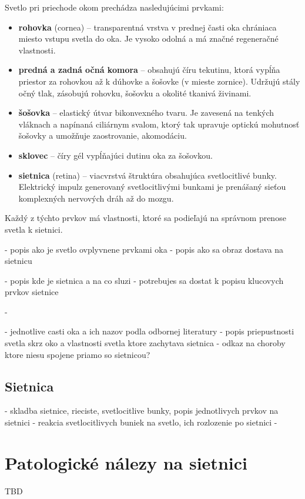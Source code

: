 Svetlo pri priechode okom prechádza nasledujúcimi prvkami\cite{zloz_oka}:
\begin{itemize}
\item \textbf{rohovka} (cornea) -- transparentná vrstva v prednej časti oka chrániaca miesto vstupu svetla do oka. Je vysoko odolná a má značné regeneračné vlastnosti.
\item \textbf{predná a zadná očná komora} -- obsahujú číru tekutinu, ktorá vypĺňa priestor za rohovkou až k dúhovke a šošovke (v mieste zornice). Udržujú stály očný tlak, zásobujú rohovku, šošovku a okolité tkanivá živinami\cite{zmysly}.
\item \textbf{šošovka} -- elastický útvar bikonvexného tvaru. Je zavesená na tenkých vláknach a napínaná ciliárnym svalom, ktorý tak upravuje optickú mohutnosť šošovky a umožňuje zaostrovanie, akomodáciu.
\item \textbf{sklovec} -- číry gél vypĺňajúci dutinu oka za šošovkou.
\item \textbf{sietnica} (retina) -- viacvrstvá štruktúra obsahujúca svetlocitlivé bunky. Elektrický impulz generovaný svetlocitlivými bunkami je prenášaný sieťou komplexných nervových dráh až do mozgu.
\end{itemize}

Každý z týchto prvkov má vlastnosti, ktoré sa podieľajú na správnom prenose svetla k sietnici. 


- popis ako je svetlo ovplyvnene prvkami oka
- popis ako sa obraz dostava na sietnicu

- popis kde je sietnica a na co sluzi \cite{vlast_oka}
- potrebujes sa dostat k popisu klucovych prvkov sietnice

- 

- jednotlive casti oka a ich nazov podla odbornej literatury
- popis priepustnosti svetla skrz oko a vlastnosti svetla ktore zachytava sietnica
- odkaz na choroby ktore niesu spojene priamo so sietnicou?

\section{Sietnica}\label{sec:sietnica}
- skladba sietnice, rieciste, svetlocitlive bunky, popis jednotlivych prvkov na sietnici
- reakcia svetlocitlivych buniek na svetlo, ich rozlozenie po sietnici
- 

\chapter{Patologické nálezy na sietnici}\label{ch:kap2}
TBD\cite{prim}
